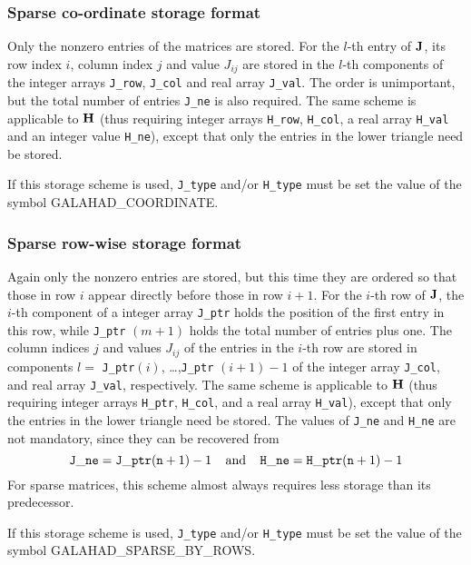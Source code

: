 \documentclass{galahad}
\newcommand{\sym}{\sf\small}
\begin{document}
\subsubsection{Sparse co-ordinate storage format}\label{coordinate}

Only the nonzero entries of the matrices are stored. For the 
$l$-th entry of ${\mathbf{J}}$, its row index $i$, column index $j$ 
and value $J_{ij}$
are stored in the $l$-th components of the integer arrays {\tt J\_row}, 
{\tt J\_col} and real array {\tt J\_val}. 
The order is unimportant, but the total
number of entries {\tt J\_ne} is also required. 
The same scheme is applicable to
${\mathbf{H}}$ (thus requiring integer arrays {\tt H\_row}, {\tt H\_col}, a real array 
{\tt H\_val} and an integer value {\tt H\_ne}),
except that only the entries in the lower triangle need be stored.

\noindent
If this storage scheme is used, {\tt J\_type} and/or {\tt H\_type} must be set
the value of the symbol {\sym GALAHAD\_COORDINATE}.

\subsubsection{Sparse row-wise storage format}\label{rowwise}

Again only the nonzero entries are stored, but this time
they are ordered so that those in row $i$ appear directly before those
in row $i+1$. For the $i$-th row of ${\mathbf{J}}$, the $i$-th component of a 
integer array {\tt J\_ptr} holds the position of the first entry in this row,
while {\tt J\_ptr} $(m+1)$ holds the total number of entries plus one.
The column indices $j$ and values $J_{ij}$ of the entries in the $i$-th row 
are stored in components 
$l =$ {\tt J\_ptr}$(i)$, \ldots ,{\tt J\_ptr} $(i+1)-1$ of the 
integer array {\tt J\_col}, and real array {\tt J\_val}, respectively. 
The same scheme is applicable to
${\mathbf{H}}$ (thus requiring integer arrays {\tt H\_ptr}, {\tt H\_col}, and 
a real array {\tt H\_val}),
except that only the entries in the lower triangle need be stored.
The values of {\tt J\_ne} and {\tt H\_ne} are not mandatory, since they can be
recovered from
\[
{\tt J\_ne} = {\tt J\_ptr}({\tt n}+1) - 1
\;\;\;\; \mbox{and} \;\;\;\;
{\tt H\_ne} = {\tt H\_ptr}({\tt n}+1) - 1
\]
For sparse matrices, this scheme almost always requires less storage than 
its predecessor.

\noindent
If this storage scheme is used, {\tt J\_type} and/or {\tt H\_type} must be set
the value of the symbol {\sym GALAHAD\_SPARSE\_BY\_ROWS}.
\end{document}
